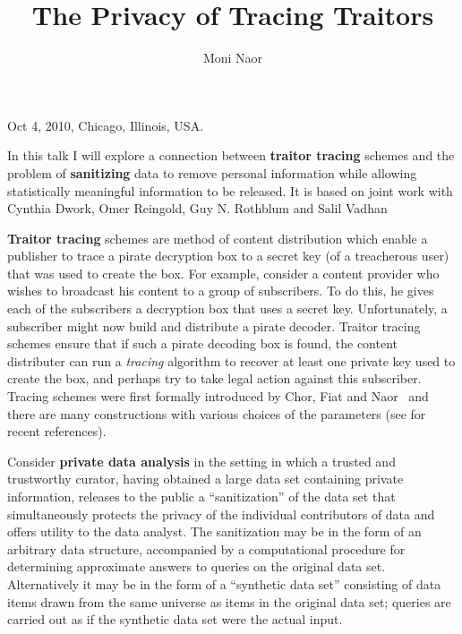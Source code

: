 \documentclass{sig-alternate}
\begin{document}
 {Oct 4, 2010, Chicago, Illinois,
USA.}  

\title{The Privacy of Tracing Traitors}



\author{
\alignauthor Moni Naor\\
}


\date{}

\maketitle


In this talk I will explore a connection between {\bf traitor tracing} schemes and the problem of {\bf sanitizing} data to remove personal information 
while allowing statistically meaningful information to be released. It is based on joint work with Cynthia Dwork, Omer Reingold, Guy N. Rothblum and Salil Vadhan~\cite{DNRRV}

{\bf Traitor tracing} schemes are  method of content
distribution which  enable a publisher to trace a pirate
decryption box to a secret key (of a treacherous user) that was used
to create the box.  For example, consider a content provider who
wishes to broadcast his content to a group of subscribers. To do
this, he gives each of the subscribers a decryption box that uses a
secret key. Unfortunately, a subscriber might now build and
distribute a pirate decoder. Traitor tracing schemes ensure that if
such a pirate decoding box is found, the content distributer can run
a {\em tracing} algorithm to recover at least one private key used
to create the box, and perhaps try to take legal action against this
subscriber. Tracing schemes were first formally introduced by Chor, Fiat and
Naor~\cite{ChorFN94} and there are many constructions with various
choices of the parameters (see \cite{BonehN08} for recent
references).

Consider {\bf private data analysis} in the setting in which a trusted
and trustworthy curator, having obtained a large data set containing
private information, releases to the public a ``sanitization'' of the
data set that simultaneously protects the privacy of the individual
contributors of data and offers utility to the data analyst. 
The sanitization may be in the form of an arbitrary data structure,
accompanied by a computational procedure for determining approximate
answers to queries on the original data set. Alternatively it may be in the 
form of a ``synthetic data set'' consisting of data items drawn from the same
universe as items in the original data set; queries are carried out as
if the synthetic data set were the actual input.  
\end{document}
